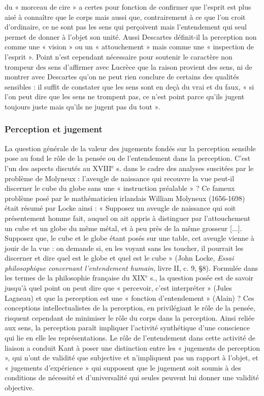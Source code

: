 du « morceau de cire » a certes pour fonction
de confirmer que l’esprit est plus aisé
à connaître que le corps mais aussi que,
contrairement à ce que l’on croit d’ordinaire,
ce ne sont pas les sens qui perçoivent
mais l’entendement qui seul permet
de donner à l’objet son unité. Aussi Descartes
définit-il la perception non comme
une « vision » ou un « attouchement »
mais comme une « inspection de l'esprit ».
Point n’est cependant nécessaire pour
soutenir le caractère non trompeur des
sens d’affirmer avec Lucrèce que la raison
provient des sens, ni de montrer avec
Descartes qu’on ne peut rien conclure de
certains des qualités sensibles : il suffit de
constater que les sens sont en deçà du vrai
et du faux, « si l’on peut dire que les sens
ne trompent pas, ce n’est point parce
qu'ils jugent toujours juste mais qu’ils ne
jugent pas du tout ».

\subsubsection{Perception et jugement}

La question générale de la valeur des
jugements fondés sur la perception sensible
pose au fond le rôle de la pensée ou
de l’entendement dans la perception.
C’est l’un des aspects discutés au {\footnotesize XVIII}$^\text{e}$ s.
dans le cadre des analyses suscitées par
le problème de Molyneux : l’aveugle de
naissance qui recouvre la vue peut-il discerner
le cube du globe sans une « instruction
préalable » ? Ce fameux problème
posé par le mathématicien irlandais William
Molyneux (1656-1698) était résumé
par Locke ainsi : « Supposez un aveugle
de naissance qui soit présentement
homme fait, auquel on ait appris à distinguer
par l’attouchement un cube et un
globe du même métal, et à peu près de la
même grosseur [...]. Supposez que, le cube
et le globe étant posés sur une table, cet
aveugle vienne à jouir de la vue : on
demande si, en les voyant sans les toucher,
il pourrait les discerner et dire quel
est le globe et quel est le cube » (John
Locke, {\it Essai philosophique concernant
l'entendement humain}, livre II, c. 9, \S 8).
Formulée dans les termes de la philosophie
française du {\footnotesize XIX}$^\text{e}$ s., la question posée
est de savoir jusqu’à quel point on peut
dire que « percevoir, c’est interpréter »
(Jules Lagneau) et que la perception est
une « fonction d’entendement » (Alain) ?
Ces conceptions intellectualistes de la
perception, en privilégiant le rôle de la
pensée, risquent cependant de minimiser
le rôle du corps dans la perception. Ainsi
reliée aux sens, la perception paraît impliquer
l'activité synthétique d’une
conscience qui lie en elle les représentations.
Le rôle de l’entendement dans cette
activité de liaison a conduit Kant à poser
une distinction entre les « jugements de
perception », qui n’ont de validité que
subjective et n’impliquent pas un rapport
à l'objet, et « jugements d'expérience »
qui supposent que le jugement soit soumis
à des conditions de nécessité et d’universalité
qui seules peuvent lui donner une
validité objective.

